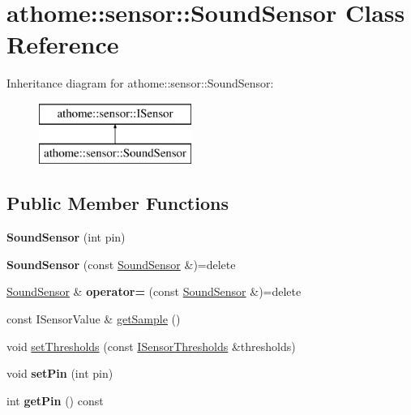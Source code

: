 \hypertarget{classathome_1_1sensor_1_1_sound_sensor}{}\section{athome\+:\+:sensor\+:\+:Sound\+Sensor Class Reference}
\label{classathome_1_1sensor_1_1_sound_sensor}
Inheritance diagram for athome\+:\+:sensor\+:\+:Sound\+Sensor\+:\begin{figure}[H]
\begin{center}
\leavevmode
\includegraphics[height=2.000000cm]{classathome_1_1sensor_1_1_sound_sensor}
\end{center}
\end{figure}
\subsection*{Public Member Functions}
\begin{DoxyCompactItemize}
\item 
\mbox{\label{classathome_1_1sensor_1_1_sound_sensor_affd617ff59a1354519c01b812b805568}} 
{\bfseries Sound\+Sensor} (int pin)
\item 
\mbox{\label{classathome_1_1sensor_1_1_sound_sensor_a581afa638adb939d606dbfbe1d419628}} 
{\bfseries Sound\+Sensor} (const \mbox{\hyperlink{classathome_1_1sensor_1_1_sound_sensor}{Sound\+Sensor}} \&)=delete
\item 
\mbox{\label{classathome_1_1sensor_1_1_sound_sensor_ab974a1520aaf9497611445dfc523ad32}} 
\mbox{\hyperlink{classathome_1_1sensor_1_1_sound_sensor}{Sound\+Sensor}} \& {\bfseries operator=} (const \mbox{\hyperlink{classathome_1_1sensor_1_1_sound_sensor}{Sound\+Sensor}} \&)=delete
\item 
const I\+Sensor\+Value \& \mbox{\hyperlink{classathome_1_1sensor_1_1_sound_sensor_a8ac5f417eee873247aff8a7e96e12817}{get\+Sample}} ()
\item 
void \mbox{\hyperlink{classathome_1_1sensor_1_1_sound_sensor_adaf42abe0443f486361656efe9587ba7}{set\+Thresholds}} (const \mbox{\hyperlink{structathome_1_1sensor_1_1_i_sensor_1_1_i_sensor_thresholds}{I\+Sensor\+Thresholds}} \&thresholds)
\item 
\mbox{\label{classathome_1_1sensor_1_1_sound_sensor_a225996767d89ef25e039ccddfab16bfc}} 
void {\bfseries set\+Pin} (int pin)
\item 
\mbox{\label{classathome_1_1sensor_1_1_sound_sensor_ae4c3496911502614bef9a00195653800}} 
int {\bfseries get\+Pin} () const
\end{DoxyCompactItemize}
